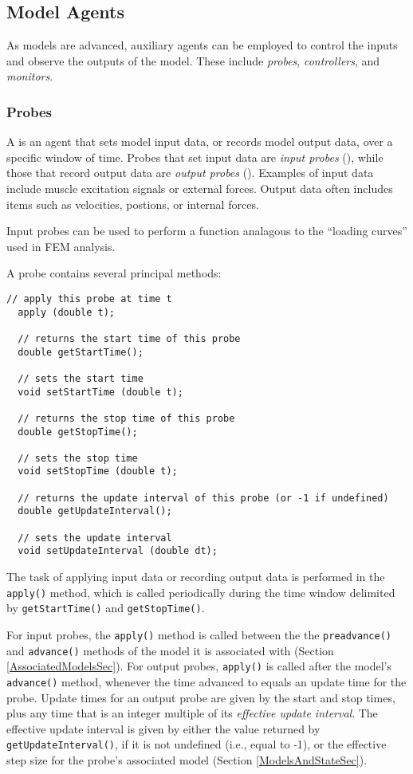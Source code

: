 \documentclass{article}
\begin{document}
\subsection{Model Agents}
\label{ModelAgentsSec}

As models are advanced, auxiliary agents can be employed to control
the inputs and observe the outputs of the model. These include
{\it probes}, {\it controllers}, and {\it monitors}.

\subsubsection{Probes}

A  is an agent that sets model
input data, or records model output data, over a specific window of
time. Probes that set input data are {\it input probes}
(), while those that
record output data are {\it output probes}
(). Examples of input
data include muscle excitation signals or external forces. Output data
often includes items such as velocities, postions, or internal forces.

Input probes can be used to perform a function analagous to
the ``loading curves'' used in FEM analysis.

A probe contains several principal methods:
\begin{lstlisting}[]
  // apply this probe at time t
  apply (double t);

  // returns the start time of this probe
  double getStartTime();

  // sets the start time
  void setStartTime (double t);

  // returns the stop time of this probe
  double getStopTime();

  // sets the stop time
  void setStopTime (double t);

  // returns the update interval of this probe (or -1 if undefined) 
  double getUpdateInterval();

  // sets the update interval
  void setUpdateInterval (double dt);
\end{lstlisting}

The task of applying input data or recording output data is performed
in the {\tt apply()} method, which is called periodically during the time
window delimited by {\tt getStartTime()} and {\tt getStopTime()}. 

For input probes, the {\tt apply()} method is called between the the
{\tt preadvance()} and {\tt advance()} methods of the model it is
associated with (Section \ref{AssociatedModelsSec}).  For output
probes, {\tt apply()} is called after the model's {\tt advance()} method,
whenever the time advanced to equals an update time for the
probe. Update times for an output probe are given by the start and
stop times, plus any time that is an integer multiple of its {\it
effective update interval}. The effective update interval is given by
either the value returned by {\tt getUpdateInterval()}, if it is not
undefined (i.e., equal to -1), or the effective step size for the
probe's associated model (Section \ref{ModelsAndStateSec}).
\end{document}
